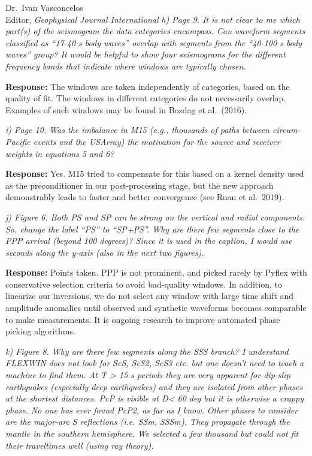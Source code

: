 \documentclass[11pt,a4paper]{letter}
\newcommand{\response}[1]{\textbf{Response:} #1}
\newcommand{\rev}[1]{{\it{#1}}}
\begin{document}
\begin{letter}{Dr.~Ivan Vasconcelos\\
Editor, \textit{Geophysical Journal International}}
\rev{h) Page 9. It is not clear to me which part(s) of the seismogram the data categories encompass. Can waveform segments classified as ``17-40 s body waves'' overlap with segments from the ``40-100 s body waves'' group? It would be helpful to show four seismograms for the different frequency bands that indicate where windows are typically chosen.
}

\response{The windows are taken independently of categories, based on the quality of fit. The windows in different categories do not necessarily overlap. Examples of such windows may be found in Bozdag et al.~(2016).}

\rev{i) Page 10. Was the imbalance in M15 (e.g., thousands of paths between circum-Pacific events and the USArray) the motivation for the source and receiver weights in equations 5 and 6?
}

\response{Yes. M15 tried to compensate for this based on a kernel density used as the preconditioner in our post-processing stage, but the new approach demonstrably leads to faster and better convergence (see Ruan et al.~2019).}

\rev{j) Figure 6. Both PS and SP can be strong on the vertical and radial components. So, change the label ``PS'' to ``SP+PS''. Why are there few segments close to the PPP arrival (beyond 100 degrees)? Since it is used in the caption, I would use seconds along the y-axis (also in the next two figures).
}

\response{Points taken. PPP is not prominent, and picked rarely by Pyflex with conservative selection criteria to avoid bad-quality windows. In addition, to linearize our inversions, we do not select any window with large time shift and amplitude anomalies until observed and synthetic waveforms becomes comparable to make measurements. It is ongoing research to improve automated phase picking algorithms.}

\rev{k) Figure 8. Why are there few segments along the SSS branch? I understand FLEXWIN does not look for ScS, ScS2, ScS3 etc. but one doesn't need to teach a machine to find them.
At T > 15 s periods they are very apparent for dip-slip earthquakes (especially deep earthquakes) and they are isolated from other phases at the shortest distances.
PcP is visible at D< 60 deg but it is otherwise a crappy phase. No one has ever found PcP2, as far as I know. Other phases to consider are the major-arc S reflections (i.e. SSm, SSSm). 
They propagate through the mantle in the southern hemisphere. We selected a few thousand but could not fit their traveltimes well (using ray theory).
}


\end{letter}
\end{document}
